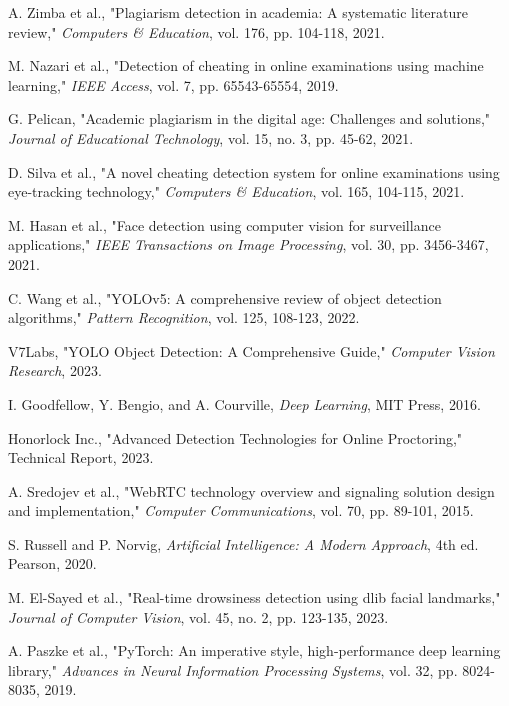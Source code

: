 \documentclass[conference]{IEEEtran}
\begin{document}
\begin{thebibliography}{99}

A. Zimba et al., "Plagiarism detection in academia: A systematic literature review," \textit{Computers \& Education}, vol. 176, pp. 104-118, 2021.

M. Nazari et al., "Detection of cheating in online examinations using machine learning," \textit{IEEE Access}, vol. 7, pp. 65543-65554, 2019.

G. Pelican, "Academic plagiarism in the digital age: Challenges and solutions," \textit{Journal of Educational Technology}, vol. 15, no. 3, pp. 45-62, 2021.

D. Silva et al., "A novel cheating detection system for online examinations using eye-tracking technology," \textit{Computers \& Education}, vol. 165, 104-115, 2021.

M. Hasan et al., "Face detection using computer vision for surveillance applications," \textit{IEEE Transactions on Image Processing}, vol. 30, pp. 3456-3467, 2021.

C. Wang et al., "YOLOv5: A comprehensive review of object detection algorithms," \textit{Pattern Recognition}, vol. 125, 108-123, 2022.

V7Labs, "YOLO Object Detection: A Comprehensive Guide," \textit{Computer Vision Research}, 2023.

I. Goodfellow, Y. Bengio, and A. Courville, \textit{Deep Learning}, MIT Press, 2016.

Honorlock Inc., "Advanced Detection Technologies for Online Proctoring," Technical Report, 2023.

A. Sredojev et al., "WebRTC technology overview and signaling solution design and implementation," \textit{Computer Communications}, vol. 70, pp. 89-101, 2015.

S. Russell and P. Norvig, \textit{Artificial Intelligence: A Modern Approach}, 4th ed. Pearson, 2020.

M. El-Sayed et al., "Real-time drowsiness detection using dlib facial landmarks," \textit{Journal of Computer Vision}, vol. 45, no. 2, pp. 123-135, 2023.

A. Paszke et al., "PyTorch: An imperative style, high-performance deep learning library," \textit{Advances in Neural Information Processing Systems}, vol. 32, pp. 8024-8035, 2019.


\end{thebibliography}
\end{document}

